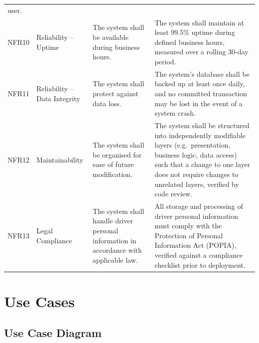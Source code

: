 \documentclass[11pt,a4paper]{article}
\begin{document}
\begin{longtable}{@{}p{1.3cm}p{2.4cm}p{5.2cm}p{5.6cm}@{}}
user. \\
NFR10 & Reliability -- Uptime & The system shall be available during
business hours. & The system shall maintain at least 99.5\% uptime during
defined business hours, measured over a rolling 30-day period. \\
NFR11 & Reliability -- Data Integrity & The system shall protect against
data loss. & The system's database shall be backed up at least once
daily, and no committed transaction may be lost in the event of a
system crash. \\
NFR12 & Maintainability & The system shall be organised for ease of
future modification. & The system shall be structured into
independently modifiable layers (e.g.\ presentation, business logic,
data access) such that a change to one layer does not require changes to
unrelated layers, verified by code review. \\
NFR13 & Legal Compliance & The system shall handle driver personal
information in accordance with applicable law. & All storage and
processing of driver personal information must comply with the
Protection of Personal Information Act (POPIA), verified against a
compliance checklist prior to deployment. \\
\bottomrule
\end{longtable}

\section{Use Cases}

\subsection{Use Case Diagram}
\end{document}

